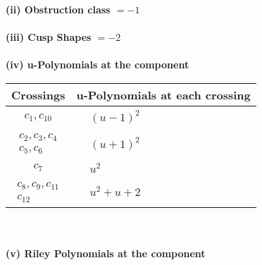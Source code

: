 \documentclass[1p]{elsarticle_modified}
\theoremstyle{definition}
\begin{document}
\flushleft \textbf{(ii) Obstruction class $= -1$}\\~\\
\flushleft \textbf{(iii) Cusp Shapes $= -2$}\\~\\
\newpage\renewcommand{\arraystretch}{1}
\flushleft \textbf{(iv) u-Polynomials at the component}\newline \\
\begin{tabular}{m{50pt}|m{274pt}}
Crossings & \hspace{64pt}u-Polynomials at each crossing \\
\hline $$\begin{aligned}c_{1},c_{10}\end{aligned}$$&$\begin{aligned}
&(u-1)^2
\end{aligned}$\\
\hline $$\begin{aligned}c_{2},c_{3},c_{4}\\c_{5},c_{6}\end{aligned}$$&$\begin{aligned}
&(u+1)^2
\end{aligned}$\\
\hline $$\begin{aligned}c_{7}\end{aligned}$$&$\begin{aligned}
&u^2
\end{aligned}$\\
\hline $$\begin{aligned}c_{8},c_{9},c_{11}\\c_{12}\end{aligned}$$&$\begin{aligned}
&u^2+u+2
\end{aligned}$\\
\hline
\end{tabular}\\~\\
\newpage\renewcommand{\arraystretch}{1}
\flushleft \textbf{(v) Riley Polynomials at the component}\newline \\
\end{document}
